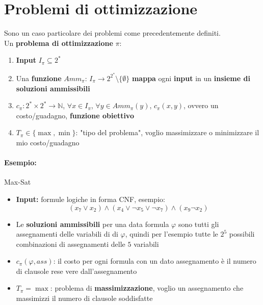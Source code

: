 
\section{Problemi di ottimizzazione}

Sono un caso particolare dei problemi come precedentemente definiti.\\

Un \textbf{problema di ottimizzazione} $\pi$: 
\begin{enumerate}
	\item \textbf{Input} $I_\pi \subseteq 2^\ast$
	
	\item Una \textbf{funzione} $Amm_\pi: \, I_\pi \rightarrow 2^{2^\ast} \setminus \{\emptyset\}$ \textbf{mappa} ogni \textbf{input} in un \textbf{insieme di soluzioni ammissibili}
	
	\item $c_\pi: 2^\ast \times 2^\ast \rightarrow \mathbb{N}$, $\forall x \in I_\pi$, $\forall y \in Amm_\pi (y)$, $c_\pi (x,y)$, ovvero un costo/guadagno, \textbf{funzione obiettivo}
	
	\item $T_\pi \in \{\max, \min\}$: "tipo del problema", voglio massimizzare o minimizzare il mio costo/guadagno
\end{enumerate}

\paragraph{Esempio:} Max-Sat
\begin{itemize}
	\item \textbf{Input:} formule logiche in forma CNF, esempio:
	$$ (x_7 \vee x_2) \wedge (x_4 \vee \neg x_5 \vee \neg x_7) \wedge (x_9 \neg x_2) $$
	
	\item Le \textbf{soluzioni ammissibili} per una data formula $\varphi$ sono tutti gli assegnamenti delle variabili di di $\varphi$, quindi per l'esempio tutte le $2^5$ possibili combinazioni di assegnamenti delle $5$ variabili
	
	\item $c_\pi (\varphi, ass)$: il costo per ogni formula con un dato assegnamento è il numero di clausole rese vere dall'assegnamento
	
	\item $T_\pi = \max$: problema di \textbf{massimizzazione}, voglio un assegnamento che massimizzi il numero di clausole soddisfatte
\end{itemize}

